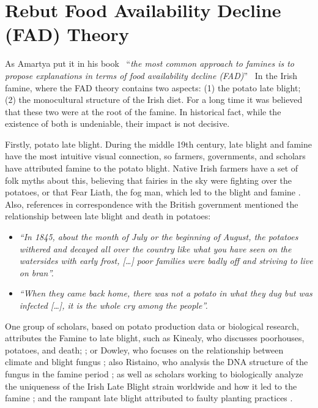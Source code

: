 \section{Rebut Food Availability Decline (FAD) Theory}

As Amartya put it in his book \textendash\ ``\textit{the most common approach to famines is to propose explanations in terms of food availability decline (FAD)}'' \citep{sen1982poverty} \textendash\ In the Irish famine, where the FAD theory contains two aspects: (1) the potato late blight; (2) the monocultural structure of the Irish diet. For a long time it was believed that these two were at the root of the famine. In historical fact, while the existence of both is undeniable, their impact is not decisive.

Firstly, potato late blight. During the middle 19th century, 
late blight and famine have the most intuitive visual connection, so farmers, governments, and scholars have attributed famine to the potato blight. Native Irish farmers have a set of folk myths about this, believing that fairies in the sky were fighting over the potatoes, or that Fear Liath, the fog man, which led to the blight and famine \citep{bartoletti2001black}. Also, references in correspondence with the British government mentioned the relationship between late blight and death in potatoes:

\begin{itemize}
    \item[] \textit{``In 1845, about the month of July or the beginning of August, the potatoes withered and decayed all over the country like what you have seen on
    the watersides with early frost, [\ldots] poor families were badly off and striving to live on bran''.} \citep{mcclureletter1848}
    \item[] \textit{``When they came back home, there was not a potato in what they dug but was infected [\ldots], it is the whole cry among the people''.} \citep{blackwellletter1845}
\end{itemize}




One group of scholars, based on potato production data or biological research, attributes the Famine to late blight, such as Kinealy, who discusses poorhouses, potatoes, and death; \citep{kinealy1990irish}; or Dowley, who focuses on the relationship between climate and blight fungus \citep{dowley1997potato}; also Ristaino, who analysis the DNA structure of the fungus in the famine period \citep{ristaino2006tracking}; as well as scholars working to biologically analyze the uniqueness of the Irish Late Blight strain worldwide and how it led to the famine \citep{goss2014irish}; and the rampant late blight attributed to faulty planting practices \citep{lidwell2020cultivating}.

